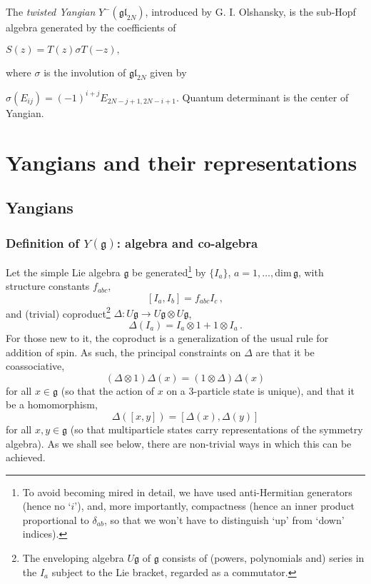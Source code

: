 \documentclass[12pt]{article}
\newcommand{\gf}{\mathfrak{g}}
\begin{document}
The {\it twisted Yangian} $Y^{-}(\mathfrak{gl}_{2N})$, introduced by G. I. Olshansky, is the sub-Hopf algebra generated by the coefficients of

$\displaystyle{ S(z)=T(z)\sigma T(-z),}$

where $\sigma$ is the involution of $\mathfrak{gl}_{2N}$ given by

$\displaystyle{\sigma(E_{ij}) = (-1)^{i+j}E_{2N-j+1,2N-i+1}.}$
Quantum determinant is the center of Yangian.


\section{Yangians and their representations}

\subsection{Yangians}

\subsubsection{Definition of $Y(\gf)$: algebra and co-algebra}

Let the simple Lie algebra $\gf$  be generated\footnote{To avoid
becoming mired in detail, we have used anti-Hermitian generators
(hence no `$i$'), and, more importantly, compactness (hence an
inner product proportional to $\delta_{ab}$, so that we won't have
to distinguish `up' from `down' indices).} by $\{I_a\}$,
$a=1,\ldots,$dim$\,\gf$, with structure constants $f_{abc}$,
\begin{equation}\label{Y1}\left[ I_a , I_b \right] = f_{abc} I_c \,,\end{equation}
 and (trivial) coproduct\footnote{The enveloping algebra $U\gf$ of $\gf$
consists of (powers, polynomials and) series in the $I_a$ subject
to the Lie bracket, regarded as a commutator.} $\Delta:
U\gf\rightarrow U\gf\otimes U\gf$, \begin{equation}\label{Y1del}
 \Delta(I_a) = I_a \otimes 1
+ 1 \otimes I_a \,. \end{equation}
 For those new to it, the
coproduct is a generalization of the usual rule for addition of
spin. As such, the principal constraints on $\Delta$ are that it
be coassociative, \begin{equation}\label{coassoc} (\Delta\otimes
1)\Delta(x)=(1\otimes\Delta)\Delta(x)\end{equation} for all $x\in\gf$ (so that
the action of $x$ on a 3-particle state is unique), and that it
 be a homomorphism, \begin{equation}\label{hom} \Delta([x,y])=[\Delta(x),\Delta(y)]
  \end{equation} for all $x,y\in\gf$ (so that multiparticle states carry
 representations of the symmetry algebra). As we shall see below,
 there are non-trivial ways in which this can be achieved.
\end{document}
